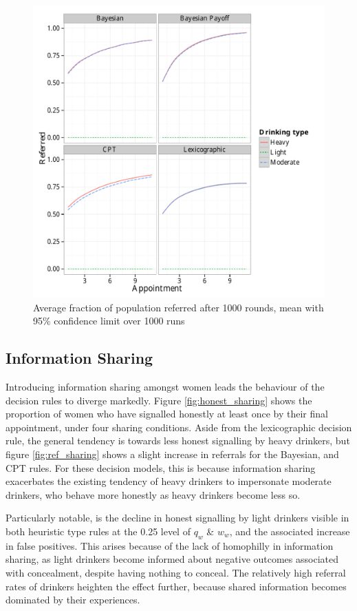 \begin{figure}[H]
\includegraphics[width=119mm]{figures/ref_plot}
\caption{Average fraction of population referred after 1000 rounds, mean with 95\% confidence limit over 1000 runs\label{fig:qt_trends}}
\end{figure}

\subsection{Information Sharing}
\label{sub:sharing_results}

Introducing information sharing amongst women leads the behaviour of the decision rules to diverge markedly. Figure \ref{fig:honest_sharing} shows the proportion of women who have signalled honestly at least once by their final appointment, under four sharing conditions. Aside from the lexicographic decision rule, the general tendency is towards less honest signalling by heavy drinkers, but figure \ref{fig:ref_sharing} shows a slight increase in referrals for the Bayesian, and \ac{CPT} rules. For these decision models, this is because information sharing exacerbates the existing tendency of heavy drinkers to impersonate moderate drinkers, who behave more honestly as heavy drinkers become less so.

Particularly notable, is the decline in honest signalling by light drinkers visible in both heuristic type rules at the 0.25 level of \(q_{w}\) \& \(w_{w}\), and the associated increase in false positives. This arises because of the lack of homophilly in information sharing, as light drinkers become informed about negative outcomes associated with concealment, despite having nothing to conceal. The relatively high referral rates of drinkers heighten the effect further, because shared information becomes dominated by their experiences. 

